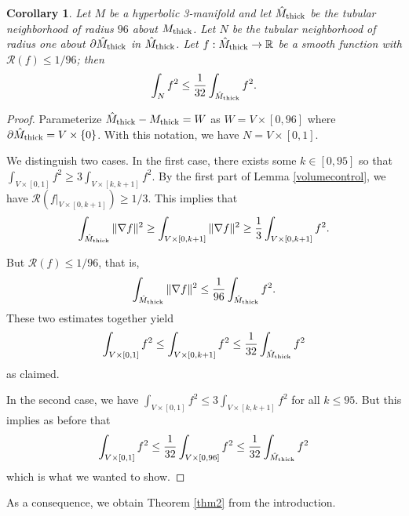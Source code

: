 \documentclass[11pt]{amsart}
\theoremstyle{plain}
\theoremstyle{plain}
\newtheorem{corollary}[theorem]{Corollary}
\theoremstyle{definition}
\newcommand{\cal}{\mathcal}
\begin{document}
\begin{corollary}\label{volume2}
Let $M$ be a hyperbolic 3-manifold and let $\hat M_{\rm thick}$ be the
tubular neighborhood of radius $96$ about $M_{\rm thick}$. 
Let $N$ be the tubular neighborhood of radius one about $\partial \hat M_{\rm thick}$
in $\hat M_{\rm thick}$. 
Let $f:\hat M_{\rm thick}\to \mathbb{R}$ be a smooth function with 
${\cal R}(f)\leq 1/96$; then
\[\int_Nf^2\leq \frac{1}{32}\int_{\hat M_{\rm thick}}f^2.\]
\end{corollary}
\begin{proof}
Parameterize $\hat M_{\rm thick}-M_{\rm thick}=W$ as $W=V\times [0,96]$
where $\partial \hat M_{\rm thick}=V\times \{0\}$. With this notation, we have
$N=V\times [0,1]$. 

We distinguish two cases. In the first case, there exists some $k\in [0,95]$
so that $\int_{V\times [0,1]}f^2\geq 3\int_{V\times [k,k+1]}f^2$. By the first
part of Lemma \ref{volumecontrol}, we have
${\cal R}(f\vert_{V\times [0,k+1]})\geq 1/3$. This implies that
\[\int_{\hat M_{\rm thick}}\Vert \nabla f\Vert^2
\geq \int_{V\times [0,k+1]} \Vert \nabla f\Vert^2\geq 
\frac{1}{3}
\int_{V\times [0,k+1]}f^2.\]

But ${\cal R}(f)\leq 1/96$, that is,
\[\int_{\hat M_{\rm thick}}\Vert \nabla f\Vert^2\leq \frac{1}{96}\int_{\hat M_{\rm thick}}f^2.\]
These two estimates together yield
\[\int_{V\times [0,1]}f^2\leq \int_{V\times [0,k+1]}f^2\leq \frac{1}{32}\int_{\hat M_{\rm thick}}f^2\]
as claimed.

In the second case, we have $\int_{V\times [0,1]}f^2\leq 3\int_{V\times [k,k+1]}f^2$ for all 
$k\leq 95$. But this implies as before that 
\[\int_{V\times [0,1]}f^2\leq \frac{1}{32}
\int_{V\times [0,96]}f^2\leq \frac{1}{32}\int_{\hat M_{\rm thick}}f^2\]
which is what we wanted to show.
\end{proof}



As a consequence, we obtain Theorem \ref{thm2} from the introduction.
\end{document}
